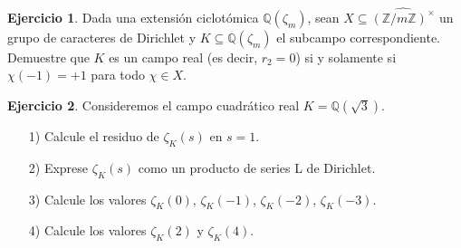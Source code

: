 \documentclass{article}
\theoremstyle{definition}
\newtheorem{ejercicio}{Ejercicio}
\newcommand{\ZZ}{\mathbb{Z}}
\newcommand{\QQ}{\mathbb{Q}}
\begin{document}
\begin{ejercicio}
  Dada una extensión ciclotómica $\QQ (\zeta_m)$, sean
  $X \subseteq \widehat{(\ZZ/m\ZZ)^\times}$ un grupo de caracteres de Dirichlet
  y $K \subseteq \QQ (\zeta_m)$ el subcampo correspondiente. Demuestre que $K$
  es un campo real (es decir, $r_2 = 0$) si y solamente si $\chi (-1) = +1$ para
  todo $\chi \in X$.
\end{ejercicio}

\begin{ejercicio}
  Consideremos el campo cuadrático real $K = \QQ (\sqrt{3})$.
  \begin{enumerate}
  \item[1)] Calcule el residuo de $\zeta_K (s)$ en $s = 1$.

  \item[2)] Exprese $\zeta_K (s)$ como un producto de series L de Dirichlet.

  \item[3)] Calcule los valores
    $\zeta_K (0)$, $\zeta_K (-1)$, $\zeta_K (-2)$, $\zeta_K (-3)$.

  \item[4)] Calcule los valores $\zeta_K (2)$ y $\zeta_K (4)$.
  \end{enumerate}
\end{ejercicio}
\end{document}
